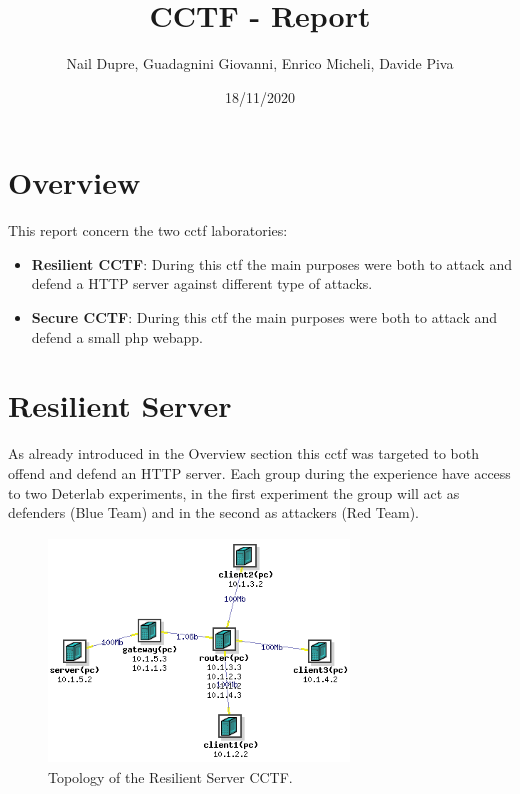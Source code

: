 \documentclass[14pt]{article}
\title{CCTF - Report}
\date{18/11/2020}
\author{Nail Dupre, Guadagnini Giovanni, Enrico Micheli, Davide Piva}
\begin{document}
	
\maketitle
	
\tableofcontents
\newpage
\section{Overview}
This report concern the two cctf laboratories:
\begin{itemize}
	\item \textbf{Resilient CCTF}: During this ctf the main purposes were both to attack and defend a HTTP server against different type of attacks.
	\item \textbf{Secure CCTF}: During this ctf the main purposes were both to attack and defend a small php webapp.
\end{itemize}

\section{Resilient Server}
As already introduced in the Overview section this cctf was targeted to both offend and defend an HTTP server. Each group during the experience have access to two Deterlab experiments, in the first experiment the group will act as defenders (Blue Team) and in the second as attackers (Red Team).

\begin{figure}[!h]
	\centering
	\includegraphics[width=8cm,height=6cm]{ResilientServerTopology}
	\caption{Topology of the Resilient Server CCTF.}
\end{figure}
\end{document}
